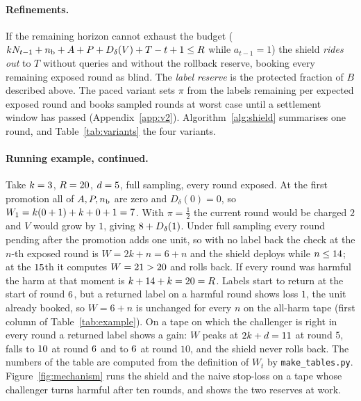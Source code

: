 \documentclass[10pt]{article}
\theoremstyle{plain}
\theoremstyle{definition}
\begin{document}
\paragraph{Refinements.}
If the remaining horizon cannot exhaust the budget ($kN_{t-1}+n_{\rm b}+A+P+D_\delta(V)+T-t+1\le R$ while $a_{t-1}=1$) the shield \emph{rides out} to $T$ without queries and without the rollback reserve, booking every remaining exposed round as blind. The \emph{label reserve} is the protected fraction of $B$ described above. The paced variant sets $\pi$ from the labels remaining per expected exposed round and books sampled rounds at worst case until a settlement window has passed (Appendix~\ref{app:v2}). Algorithm~\ref{alg:shield} summarises one round, and Table~\ref{tab:variants} the four variants.

\paragraph{Running example, continued.}
Take $k=\ExK$, $R=\ExR$, $d=\ExD$, full sampling, every round exposed. At the first promotion all of $A,P,n_{\rm b}$ are zero and $D_\delta(0)=0$, so $W_1=k(0+1)+k+0+1=7$. With $\pi=\tfrac12$ the current round would be charged $2$ and $V$ would grow by $1$, giving $8+D_\delta(1)$. Under full sampling every round pending after the promotion adds one unit, so with no label back the check at the $n$-th exposed round is $W=2k+n=6+n$ and the shield deploys while $n\le14$; at the $15$th it computes $W=21>20$ and rolls back. If every round was harmful the harm at that moment is $k+14+k=20=R$. Labels start to return at the start of round $6$, but a returned label on a harmful round shows loss $1$, the unit already booked, so $W=6+n$ is unchanged for every $n$ on the all-harm tape (first column of Table~\ref{tab:example}). On a tape on which the challenger is right in every round a returned label shows a gain: $W$ peaks at $2k+d=11$ at round $5$, falls to $10$ at round $6$ and to $6$ at round $10$, and the shield never rolls back. The numbers of the table are computed from the definition of $W_t$ by \texttt{make\_tables.py}. Figure~\ref{fig:mechanism} runs the shield and the naive stop-loss on a tape whose challenger turns harmful after ten rounds, and shows the two reserves at work.



\begin{table}[t]
\caption{Running example ($k=\ExK$, $R=\ExR$, $d=\ExD$, full sampling, every round exposed, promotion at round 1): the check $W$ at the $n$-th exposed round on a tape where every round is harmful and on one where every round benefits the challenger.}\label{tab:example}
\centering\small

\end{table}
\end{document}
